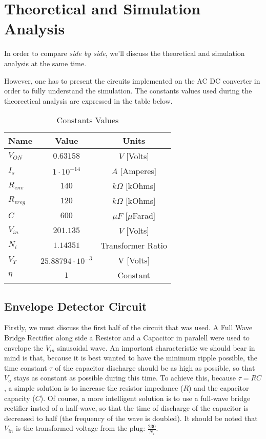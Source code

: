 \section{Theoretical and Simulation Analysis}
\label{sec:analysis}

In order to compare \textit{side by side}, we'll discuss the theoretical and simulation analysis at the same time.

However, one has to present the circuits implemented on the AC DC converter in order to fully understand the simulation. The constants values used during the theorectical analysis are expressed in the table below.

\begin{table}[h]
    \centering
    \begin{tabular}{|l|c|c|}
    \hline
    {\bf Name} & {\bf Value} & {\bf Units} \\ \hline
    $V_{ON}$\footnotemark & $0.63158$ & $V$ [Volts] \\ \hline
    $I_s$ & $1\cdot10^{-14}$ & $A$ [Amperes] \\ \hline
    $R_{env}$ & $140$ & $k\Omega$ [kOhms] \\ \hline
    $R_{vreg}$ & $120$ & $k\Omega$ [kOhms] \\ \hline
    $C$ & $600$ & $\mu F$ [$\mu$Farad] \\ \hline
    $V_{in}$ & $201.135$ & $V$ [Volts] \\ \hline
    $N_i$ & $1.14351$ & Transformer Ratio \\ \hline
    $V_T$ & $25.88794\cdot10^{-3}$ & V [Volts]\\ \hline
    $\eta$ & $1$ & Constant \\ \hline
    \end{tabular}
    \caption{Constants Values}
    \label{tab:constants}
\end{table}

\subsection{Envelope Detector Circuit}
\label{subsec:stat}

Firstly, we must discuss the first half of the circuit that was used. A Full Wave Bridge Rectifier along side a Resistor and a Capacitor in paralell were used to envelope the $V_{in}$ sinusoidal wave. An important characteristic we should bear in mind is that, because it is best wanted to have the minimum ripple possible, the time constant $\tau$ of the capacitor discharge should be as high as possible, so that $V_o$ stays as constant as possible during this time. To achieve this, because $\tau=RC$, a simple solution is to increase the resistor impedance ($R$) and the capacitor capacity ($C$). Of course, a more intelligent solution is to use a full-wave bridge rectifier insted of a half-wave, so that the time of discharge of the capacitor is decreased to half (the frequency of the wave is doubled). It should be noted that $V_{in}$ is the transformed voltage from the plug: $\frac{230}{N_i}$. 

